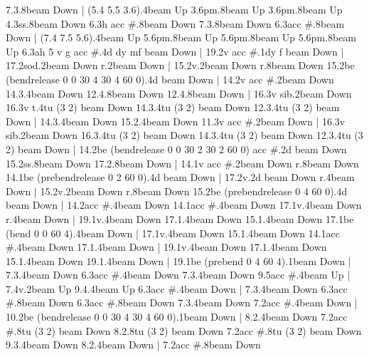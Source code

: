       7.3.8{beam Down}
    |
      (5.4 5.5 3.6).4{beam Up}
      3.6{pm}.8{beam Up}
      3.6{pm}.8{beam Up}
      4.3{ss}.8{beam Down}
      6.3{h acc #}.8{beam Down}
      7.3.8{beam Down}
      6.3{acc #}.8{beam Down}
    |
      (7.4 7.5 5.6).4{beam Up}
      5.6{pm}.8{beam Up}
      5.6{pm}.8{beam Up}
      5.6{pm}.8{beam Up}
      6.3{ah 5 v g acc #}.4{d dy mf beam Down}
    |
      19.2{v acc #}.1{dy f beam Down}
    |
      17.2{sod}.2{beam Down}
      r.2{beam Down}
    |
      15.2{v}.2{beam Down}
      r.8{beam Down}
      15.2{be (bendrelease 0 0 30 4 30 4 60 0)}.4{d beam Down}
    |
      14.2{v acc #}.2{beam Down}
      14.3.4{beam Down}
      12.4.8{beam Down}
      12.4.8{beam Down}
    |
      16.3{v sib}.2{beam Down}
      16.3{v t}.4{tu (3 2) beam Down}
      14.3.4{tu (3 2) beam Down}
      12.3.4{tu (3 2) beam Down}
    |
      14.3.4{beam Down}
      15.2.4{beam Down}
      11.3{v acc #}.2{beam Down}
    |
      16.3{v sib}.2{beam Down}
      16.3.4{tu (3 2) beam Down}
      14.3.4{tu (3 2) beam Down}
      12.3.4{tu (3 2) beam Down}
    |
      14.2{be (bendrelease 0 0 30 2 30 2 60 0) acc #}.2{d beam Down}
      15.2{ss}.8{beam Down}
      17.2.8{beam Down}
    |
      14.1{v acc #}.2{beam Down}
      r.8{beam Down}
      14.1{be (prebendrelease 0 2 60 0)}.4{d beam Down}
    |
      17.2{v}.2{d beam Down}
      r.4{beam Down}
    |
      15.2{v}.2{beam Down}
      r.8{beam Down}
      15.2{be (prebendrelease 0 4 60 0)}.4{d beam Down}
    |
      14.2{acc #}.4{beam Down}
      14.1{acc #}.4{beam Down}
      17.1{v}.4{beam Down}
      r.4{beam Down}
    |
      19.1{v}.4{beam Down}
      17.1.4{beam Down}
      15.1.4{beam Down}
      17.1{be (bend 0 0 60 4)}.4{beam Down}
    |
      17.1{v}.4{beam Down}
      15.1.4{beam Down}
      14.1{acc #}.4{beam Down}
      17.1.4{beam Down}
    |
      19.1{v}.4{beam Down}
      17.1.4{beam Down}
      15.1.4{beam Down}
      19.1.4{beam Down}
    |
      19.1{be (prebend 0 4 60 4)}.1{beam Down}
    |
      7.3.4{beam Down}
      6.3{acc #}.4{beam Down}
      7.3.4{beam Down}
      9.5{acc #}.4{beam Up}
    |
      7.4{v}.2{beam Up}
      9.4.4{beam Up}
      6.3{acc #}.4{beam Down}
    |
      7.3.4{beam Down}
      6.3{acc #}.8{beam Down}
      6.3{acc #}.8{beam Down}
      7.3.4{beam Down}
      7.2{acc #}.4{beam Down}
    |
      10.2{be (bendrelease 0 0 30 4 30 4 60 0)}.1{beam Down}
    |
      8.2.4{beam Down}
      7.2{acc #}.8{tu (3 2) beam Down}
      8.2.8{tu (3 2) beam Down}
      7.2{acc #}.8{tu (3 2) beam Down}
      9.3.4{beam Down}
      8.2.4{beam Down}
    |
      7.2{acc #}.8{beam Down}

